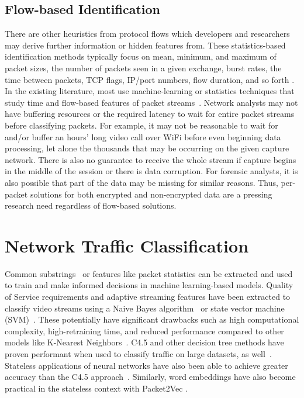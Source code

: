 \subsection{Flow-based Identification}

There are other heuristics from protocol flows which developers and researchers may derive further information or hidden features from. These statistics-based identification methods typically focus on mean, minimum, and maximum of packet sizes, the number of packets seen in a given exchange, burst rates, the time between packets, TCP flags, IP/port numbers, flow duration, and so forth \cite{Moore2013DiscriminatorsFU, ZHAO202122, Paxson}.
In the existing literature, most use machine-learning or statistics techniques that study time and flow-based features of packet streams~\cite{Salman, Cao, Lim, LiZ, Song2019, iscx-vpn-paper, iscx-tor-paper}. Network analysts may not have buffering resources or the required latency to wait for entire packet streams before classifying packets. For example, it may not be reasonable to wait for and/or buffer an hours' long video call over WiFi before even beginning data processing, let alone the thousands that may be occurring on the given capture network. There is also no guarantee to receive the whole stream if capture begins in the middle of the session or there is data corruption. For forensic analysts, it is also possible that part of the data may be missing for similar reasons. Thus, per-packet solutions for both encrypted and non-encrypted data are a pressing research need regardless of flow-based solutions.

\section{Network Traffic Classification}

Common substrings~\cite{sigbox} or features like packet statistics can be extracted and used to train and make informed decisions in machine learning-based models. Quality of Service requirements and adaptive streaming features have been extracted to classify video streams using a Naive Bayes algorithm~\cite{DIAS2019143} or state vector machine (SVM)~\cite{LiZ, Cao}. These potentially have significant drawbacks such as high computational complexity, high-retraining time, and reduced performance compared to other models like K-Nearest Neighbors~\cite{Salman}. C4.5 and other decision tree methods have proven performant when used to classify traffic on large datasets, as well~\cite{Yuan, iscx-vpn-paper}. Stateless applications of neural networks have also been able to achieve greater accuracy than the C4.5 approach~\cite{deeppacket}. Similarly, word embeddings have also become practical in the stateless context with Packet2Vec \cite{packet2vec}.

